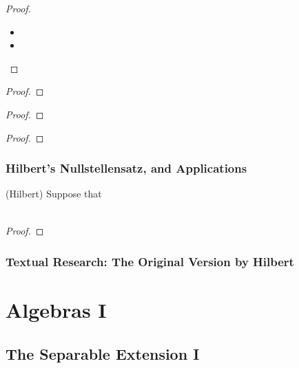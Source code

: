 \documentclass[Total.tex]{subfiles}
\begin{document}
	\begin{proof}
		\begin{itemize}
			\item 
			\item 
		\end{itemize}
	\end{proof}
	
	\begin{theorem}
	\end{theorem}
	
	\begin{proof}
	\end{proof}
	
	\begin{theorem}
	\end{theorem}
	
	\begin{proof}
	\end{proof}
	
	
	\begin{lemma}
	\end{lemma}
	
	\begin{proof}
	\end{proof}
	
	\subsection{Hilbert's Nullstellensatz, and Applications}
	
	\begin{theorem}
		(Hilbert) Suppose that
		
		\begin{gather*}
		\end{gather*}
	\end{theorem}
	
	\begin{proof}
	\end{proof}
	
	\subsection{Textual Research: The Original Version by Hilbert}
	
	\chapter{Algebras I}
		\section{The Separable Extension I}
\end{document}
